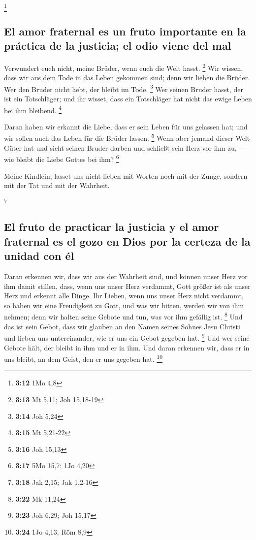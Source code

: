 \footnote{\textbf{3:12} 1Mo 4,8}

\hypertarget{el-amor-fraternal-es-un-fruto-importante-en-la-pruxe1ctica-de-la-justicia-el-odio-viene-del-mal}{%
\subsection{El amor fraternal es un fruto importante en la práctica de
la justicia; el odio viene del
mal}\label{el-amor-fraternal-es-un-fruto-importante-en-la-pruxe1ctica-de-la-justicia-el-odio-viene-del-mal}}

 Verwundert euch nicht, meine Brüder, wenn euch die Welt
hasst. \footnote{\textbf{3:13} Mt 5,11; Joh 15,18-19} 
Wir wissen, dass wir aus dem Tode in das Leben gekommen sind; denn wir
lieben die Brüder. Wer den Bruder nicht liebt, der bleibt im Tode.
\footnote{\textbf{3:14} Joh 5,24}  Wer seinen Bruder
hasst, der ist ein Totschläger; und ihr wisset, dass ein Totschläger hat
nicht das ewige Leben bei ihm bleibend. \footnote{\textbf{3:15} Mt
  5,21-22}

 Daran haben wir erkannt die Liebe, dass er sein Leben
für uns gelassen hat; und wir sollen auch das Leben für die Brüder
lassen. \footnote{\textbf{3:16} Joh 15,13}  Wenn aber
jemand dieser Welt Güter hat und sieht seinen Bruder darben und schließt
sein Herz vor ihm zu, -- wie bleibt die Liebe Gottes bei ihm?
\footnote{\textbf{3:17} 5Mo 15,7; 1Jo 4,20}

 Meine Kindlein, lasset uns nicht lieben mit Worten noch
mit der Zunge, sondern mit der Tat und mit der Wahrheit.

\footnote{\textbf{3:18} Jak 2,15; Jak 1,2-16}

\hypertarget{el-fruto-de-practicar-la-justicia-y-el-amor-fraternal-es-el-gozo-en-dios-por-la-certeza-de-la-unidad-con-uxe9l}{%
\subsection{El fruto de practicar la justicia y el amor fraternal es el
gozo en Dios por la certeza de la unidad con
él}\label{el-fruto-de-practicar-la-justicia-y-el-amor-fraternal-es-el-gozo-en-dios-por-la-certeza-de-la-unidad-con-uxe9l}}

 Daran erkennen wir, dass wir aus der Wahrheit sind, und
können unser Herz vor ihm damit stillen,  dass, wenn uns
unser Herz verdammt, Gott größer ist als unser Herz und erkennt alle
Dinge.  Ihr Lieben, wenn uns unser Herz nicht verdammt,
so haben wir eine Freudigkeit zu Gott,  und was wir
bitten, werden wir von ihm nehmen; denn wir halten seine Gebote und tun,
was vor ihm gefällig ist. \footnote{\textbf{3:22} Mk 11,24}
 Und das ist sein Gebot, dass wir glauben an den Namen
seines Sohnes Jesu Christi und lieben uns untereinander, wie er uns ein
Gebot gegeben hat. \footnote{\textbf{3:23} Joh 6,29; Joh 15,17}
 Und wer seine Gebote hält, der bleibt in ihm und er in
ihm. Und daran erkennen wir, dass er in uns bleibt, an dem Geist, den er
uns gegeben hat. \footnote{\textbf{3:24} 1Jo 4,13; Röm 8,9}

